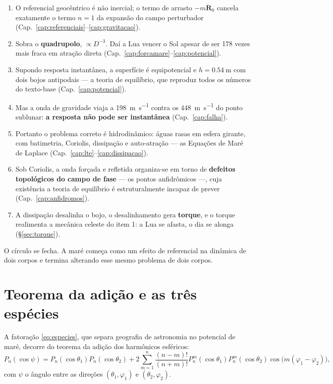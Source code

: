 \documentclass[11pt,a4paper,oneside]{report}
\theoremstyle{definition}
\theoremstyle{plain}
\theoremstyle{remark}
\newcommand{\vect}[1]{\bm{#1}}
\begin{document}
\begin{enumerate}
\item O referencial geocêntrico é não inercial; o termo de arrasto
  $-m\ddot{\vect{R}}_0$ cancela exatamente o termo $n=1$ da expansão do campo
  perturbador (Cap.~\ref{cap:referenciais}--\ref{cap:gravitacao}).
\item Sobra o \textbf{quadrupolo}, $\propto D^{-3}$. Daí a Lua vencer o Sol
  apesar de ser 178 vezes mais fraca em atração direta
  (Cap.~\ref{cap:forcamare}--\ref{cap:potencial}).
\item Supondo resposta instantânea, a superfície é equipotencial e
  $h=\SI{0.54}{\meter}$ com dois bojos antipodais — a teoria de equilíbrio, que
  reproduz todos os números do texto-base (Cap.~\ref{cap:potencial}).
\item Mas a onda de gravidade viaja a \SI{198}{\meter\per\second} contra os
  \SI{448}{\meter\per\second} do ponto sublunar: \textbf{a resposta não pode ser
  instantânea} (Cap.~\ref{cap:falha}).
\item Portanto o problema correto é hidrodinâmico: águas rasas em esfera
  girante, com batimetria, Coriolis, dissipação e auto-atração — as Equações de
  Maré de Laplace (Cap.~\ref{cap:lte}--\ref{cap:dissipacao}).
\item Sob Coriolis, a onda forçada e refletida organiza-se em torno de
  \textbf{defeitos topológicos do campo de fase} — os pontos anfidrômicos —,
  cuja existência a teoria de equilíbrio é estruturalmente incapaz de prever
  (Cap.~\ref{cap:anfidromos}).
\item A dissipação desalinha o bojo, o desalinhamento gera \textbf{torque}, e o
  torque realimenta a mecânica celeste do item 1: a Lua se afasta, o dia se
  alonga (\S\ref{sec:torque}).
\end{enumerate}

O círculo se fecha. A maré começa como um efeito de referencial na dinâmica de
dois corpos e termina alterando esse mesmo problema de dois corpos.

\appendix

\chapter{Teorema da adição e as três espécies}
\label{ap:legendre}

A fatoração \eqref{eq:especies}, que separa geografia de astronomia no
potencial de maré, decorre do teorema da adição dos harmônicos esféricos:
\begin{equation}
P_n(\cos\psi)=P_n(\cos\theta_1)P_n(\cos\theta_2)
+2\sum_{m=1}^{n}\frac{(n-m)!}{(n+m)!}
P_n^{m}(\cos\theta_1)P_n^{m}(\cos\theta_2)\cos\!\big(m(\varphi_1-\varphi_2)\big),
\end{equation}
com $\psi$ o ângulo entre as direções $(\theta_1,\varphi_1)$ e
$(\theta_2,\varphi_2)$.
\end{document}
